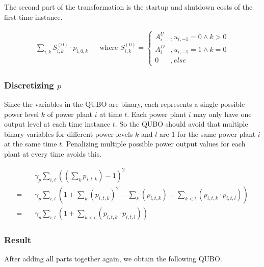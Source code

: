 The second part of the transformation is the startup and shutdown costs of the first time instance.

\begin{align}
  \sum_{i, k} S_{i, k}^{(0)} \cdot p_{i, 0, k}
  & & \text{where }
  S_{i, k}^{(0)} = \begin{cases}
    A_i^U & , u_{i, -1} = 0 \land k > 0 \\
    A_i^D & , u_{i, -1} = 1 \land k = 0 \\
    0 & , else
  \end{cases}
\end{align}

\subsubsection{Discretizing $p$}

Since the variables in the QUBO are binary, each represents a single possible power level $k$ of power plant $i$ at time $t$.
Each power plant $i$ may only have one output level at each time instance $t$.
So the QUBO should avoid that multiple binary variables for different power levels $k$ and $l$ are $1$ for the same power plant $i$ at the same time $t$.
Penalizing multiple possible power output values for each plant at every time avoids this.

\begin{subequations}
\begin{align}
  & \gamma_p \sum_{i, t} \left( \left( \sum_k p_{i, t, k} \right) - 1 \right)^2
  \\ = \quad &
  \gamma_p \sum_{i, t} \left(
    1
    + \sum_k \left( p_{i, t, k} \right)^2
    - \sum_k \left( p_{i, t, k} \right)
    + \sum_{k < l} \left( p_{i, t, k} \cdot p_{i, t, l} \right)
  \right)
  \\ = \quad &
  \gamma_p \sum_{i, t} \left(
    1
    + \sum_{k < l} \left( p_{i, t, k} \cdot p_{i, t, l} \right)
  \right)
\end{align}
\end{subequations}

\subsubsection{Result}

After adding all parts together again, we obtain the following QUBO.

